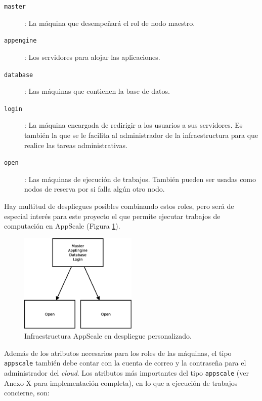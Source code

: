 \begin{description}
\item[\texttt{master}]: La máquina que desempeñará el rol de nodo maestro.
\item[\texttt{appengine}]: Los servidores para alojar las aplicaciones.
\item[\texttt{database}]: Las máquinas que contienen la base de datos.
\item[\texttt{login}]: La máquina encargada de redirigir a los usuarios a sus servidores. Es también la que se le facilita al administrador de la infraestructura para que realice las tareas administrativas.
\item[\texttt{open}]: Las máquinas de ejecución de trabajos. También pueden ser usadas como nodos de reserva por si falla algún otro nodo.
\end{description}

Hay multitud de despliegues posibles combinando estos roles, pero será de especial interés para este proyecto el que permite ejecutar trabajos de computación en AppScale (Figura \ref{figure:arquitectura-appscale}).

\begin{figure} [!htbp]
  \centering
  \includegraphics[width=0.5\textwidth]{figuras/Arquitectura_AppScale.eps}
  \caption{Infraestructura AppScale en despliegue personalizado.}
\label{figure:arquitectura-appscale}
\end{figure}

Además de los atributos necesarios para los roles de las máquinas, el tipo \texttt{appscale} también debe contar con la cuenta de correo y la contraseña para el administrador del \emph{cloud}. Los atributos más importantes del tipo \texttt{appscale} (ver Anexo X para implementación completa), en lo que a ejecución de trabajos concierne, son:

